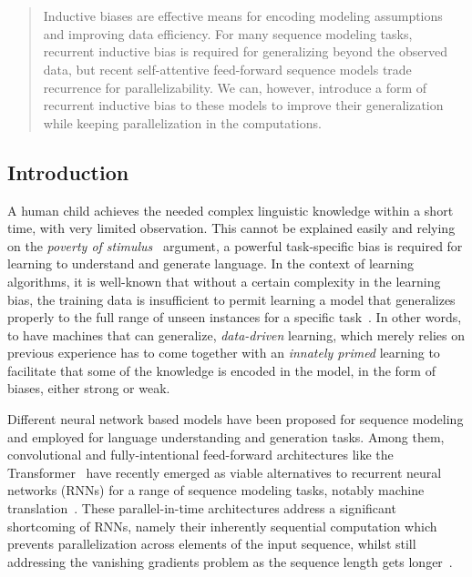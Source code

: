 \chapter{}

\label{chap:6}
%
\begin{quote}
Inductive biases are effective means for encoding modeling assumptions and improving data efficiency. For many sequence modeling tasks, recurrent inductive bias is required for generalizing beyond the observed data, but recent self-attentive feed-forward sequence models trade recurrence for parallelizability. We can, however, introduce a form of recurrent inductive bias to these models to improve their generalization while keeping parallelization in the computations. 
\end{quote}
%

\section{Introduction}
A human child achieves the needed complex linguistic knowledge within a short time, with very limited observation. This cannot be explained easily and relying on the \emph{poverty of stimulus}~\citep{chomsky1980rules} argument, a powerful task-specific bias is required for learning to understand and generate language. In the context of learning algorithms, it is well-known that without a certain complexity in the learning bias, the training data is insufficient to permit learning a model that generalizes properly to the full range of unseen instances for a specific task~\cite{Mitchell80theneed}. 
In other words, to have machines that can generalize, \emph{data-driven} learning, which merely relies on previous experience has to come together with an \emph{innately primed} learning to facilitate that some of the knowledge is encoded in the model, in the form of biases, either strong or weak.

Different neural network based models have been proposed for sequence modeling and employed for language understanding and generation tasks. Among them, convolutional and fully-intentional feed-forward architectures like the Transformer~\citep{transformer} have recently emerged as viable alternatives to recurrent neural networks (RNNs) for a range of sequence modeling tasks, notably machine translation~\citep{JonasFaceNet2017,transformer}. These parallel-in-time architectures address a significant shortcoming of RNNs, namely their inherently sequential computation which prevents parallelization across elements of the input sequence, whilst still addressing the vanishing gradients problem as the sequence length gets longer~\citep{vanishing-exploding-gradient}.


